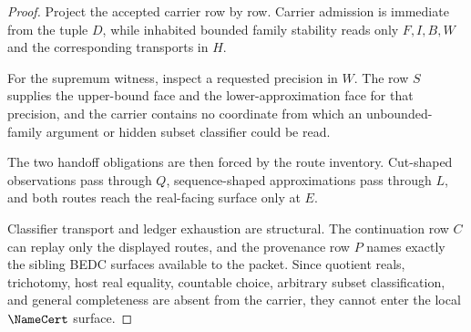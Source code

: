 \begin{proof}
Project the accepted carrier row by row. Carrier admission is immediate from the tuple $D$, while inhabited bounded family stability reads only $F,I,B,W$ and the corresponding transports in $H$.

For the supremum witness, inspect a requested precision in $W$. The row $S$ supplies the upper-bound face and the lower-approximation face for that precision, and the carrier contains no coordinate from which an unbounded-family argument or hidden subset classifier could be read.

The two handoff obligations are then forced by the route inventory. Cut-shaped observations pass through $Q$, sequence-shaped approximations pass through $L$, and both routes reach the real-facing surface only at $E$.

Classifier transport and ledger exhaustion are structural. The continuation row $C$ can replay only the displayed routes, and the provenance row $P$ names exactly the sibling BEDC surfaces available to the packet. Since quotient reals, trichotomy, host real equality, countable choice, arbitrary subset classification, and general completeness are absent from the carrier, they cannot enter the local $\NameCert$ surface.
\end{proof}

